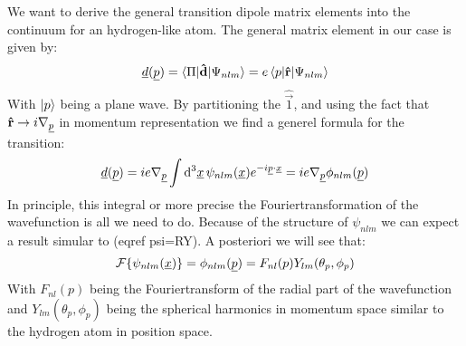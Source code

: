 We want to derive the general transition dipole matrix elements into the continuum for an hydrogen-like atom. The general matrix element in our case is given by:
\begin{equation*}
    \underline{d}(\underline{p}) = \braket{\Pi|\mathbf{\hat{d}}|\Psi_{nlm}} = e\braket{p|\mathbf{\hat{r}}|\Psi_{nlm}}
\end{equation*}
With $\ket{p}$ being a plane wave. By partitioning the $\hat{\vec{1}}$, and using the fact that $\mathbf{\hat{r}} \rightarrow i\nabla_{\underline{p}}$ %
in momentum representation we find a generel formula for the transition:
\begin{equation*}
    \underline{d}(\underline{p}) = ie\nabla_{\underline{p}}\int \mathrm{d}^3\underline{x}\,\psi_{nlm}(\underline{x}) e^{-i\underline{p}\cdot\underline{x}} = ie\nabla_{\underline{p}}\phi_{nlm}(\underline{p})
\end{equation*}
In principle, this integral or more precise the Fouriertransformation of the wavefunction is all we need to do.
Because of the structure of $\psi_{nlm}$ we can expect a result simular to (eqref psi=RY).
A posteriori we will see that:
\begin{equation*}
    \mathcal{F}\{\psi_{nlm}(\underline{x})\} = \phi_{nlm}(\underline{p}) = F_{nl}(p)Y_{lm}(\theta_p, \phi_p)
\end{equation*}
With $F_{nl}(p)$ being the Fouriertransform of the radial part of the wavefunction and $Y_{lm}(\theta_p, \phi_p)$ being the spherical harmonics in momentum space similar to the hydrogen atom in position space.




